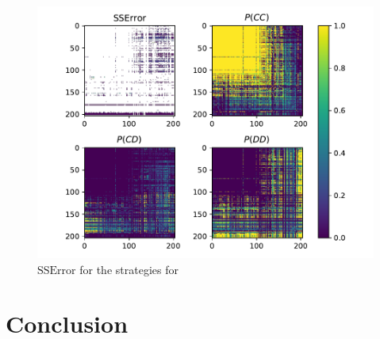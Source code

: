 \documentclass[a4paper]{article}
\begin{document}
\begin{figure}[!htbp]
    \centering
    \includegraphics[width=.8\textwidth]{./assets/img/SSError_and_probabilities_in_full/main.pdf}
    \caption{\(\text{SSError}\) for the strategies for } %
    \label{fig:SSError_and_probabilities_in_full}
\end{figure}


\section{Conclusion}\label{sec:conclusion}


\printbibliography
\end{document}
